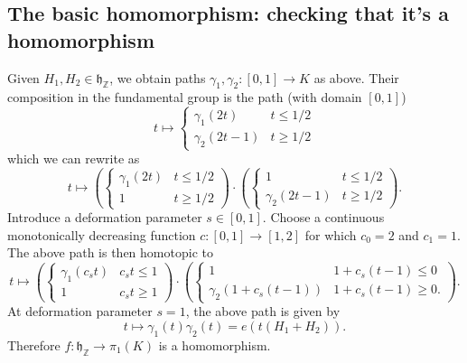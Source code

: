 \documentclass[reqno]{amsart} 
\begin{document}
\subsection{The basic homomorphism: checking that it's a homomorphism}
\label{sec:orgddabaf2}
Given $H_1, H_2 \in \mathfrak{h}_\mathbb{Z}$, we obtain paths $\gamma_1, \gamma_2 : [0,1] \rightarrow K$ as above.  Their composition in the fundamental group is the path (with domain $[0,1]$)
\begin{equation*}
  t \mapsto
  \begin{cases}
    \gamma_1(2 t) & t \leq 1/2 \\
    \gamma_2(2 t - 1) &  t \geq 1/2
  \end{cases}
\end{equation*}
which we can rewrite as
\begin{equation*}
  t \mapsto \left(
    \begin{cases}
      \gamma_1(2 t) & t \leq 1/2 \\
      1 &  t \geq 1/2
    \end{cases}
  \right) \cdot \left(
    \begin{cases}
      1 & t \leq 1/2 \\
      \gamma_2(2 t - 1) &  t \geq 1/2
    \end{cases}
  \right).
\end{equation*}
Introduce a deformation parameter $s \in [0,1]$.  Choose a continuous monotonically decreasing function $c : [0,1] \rightarrow [1,2]$ for which $c_0 = 2$ and $c_1 = 1$.  The above path is then homotopic to
\begin{equation*}
  t \mapsto \left(
    \begin{cases}
      \gamma_1(c_s t) & c_s t \leq 1 \\
      1 &  c_s t \geq 1
    \end{cases}
  \right) \cdot \left(
    \begin{cases}
      1 & 1 + c_s (t  - 1) \leq 0 \\
      \gamma_2(1 + c_s (t - 1)) &  1 + c_s(t-1) \geq 0.
    \end{cases}
  \right).
\end{equation*}
At deformation parameter $s=1$, the above path is given by
\begin{equation*}
  t \mapsto \gamma_1(t) \gamma_2(t) = e(t (H_1 + H_2)).
\end{equation*}
Therefore $f : \mathfrak{h}_\mathbb{Z} \rightarrow \pi_1(K)$ is a homomorphism.
\end{document}
